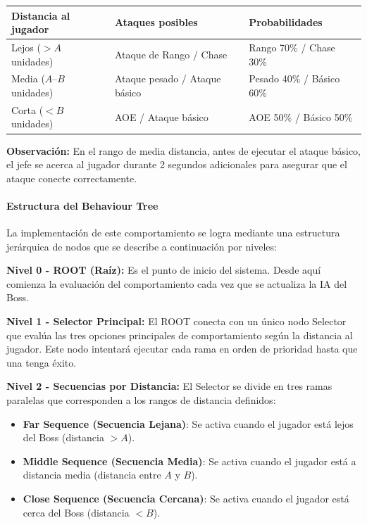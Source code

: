 \documentclass[informe]{upropuesta}
\begin{document}
\begin{center}
\begin{tabular}{|l|l|l|}
\hline
\textbf{Distancia al jugador} & \textbf{Ataques posibles} & \textbf{Probabilidades} \\
\hline
Lejos ($>A$ unidades) & Ataque de Rango / Chase & Rango 70\% / Chase 30\% \\
\hline
Media ($A$--$B$ unidades) & Ataque pesado / Ataque básico & Pesado 40\% / Básico 60\% \\
\hline
Corta ($<B$ unidades) & AOE / Ataque básico & AOE 50\% / Básico 50\% \\
\hline
\end{tabular}
\end{center}

\textbf{Observación:} En el rango de media distancia, antes de ejecutar el ataque básico, el jefe se acerca al jugador durante 2 segundos adicionales para asegurar que el ataque conecte correctamente.

\paragraph{Estructura del Behaviour Tree}

La implementación de este comportamiento se logra mediante una estructura jerárquica de nodos que se describe a continuación por niveles:

\textbf{Nivel 0 - ROOT (Raíz):}
Es el punto de inicio del sistema. Desde aquí comienza la evaluación del comportamiento cada vez que se actualiza la IA del Boss.

\textbf{Nivel 1 - Selector Principal:}
El ROOT conecta con un único nodo Selector que evalúa las tres opciones principales de comportamiento según la distancia al jugador. Este nodo intentará ejecutar cada rama en orden de prioridad hasta que una tenga éxito.

\textbf{Nivel 2 - Secuencias por Distancia:}
El Selector se divide en tres ramas paralelas que corresponden a los rangos de distancia definidos:

\begin{itemize}
    \item \textbf{Far Sequence (Secuencia Lejana)}: Se activa cuando el jugador está lejos del Boss (distancia $>A$).
    \item \textbf{Middle Sequence (Secuencia Media)}: Se activa cuando el jugador está a distancia media (distancia entre $A$ y $B$).
    \item \textbf{Close Sequence (Secuencia Cercana)}: Se activa cuando el jugador está cerca del Boss (distancia $<B$).
\end{itemize}
\end{document}
